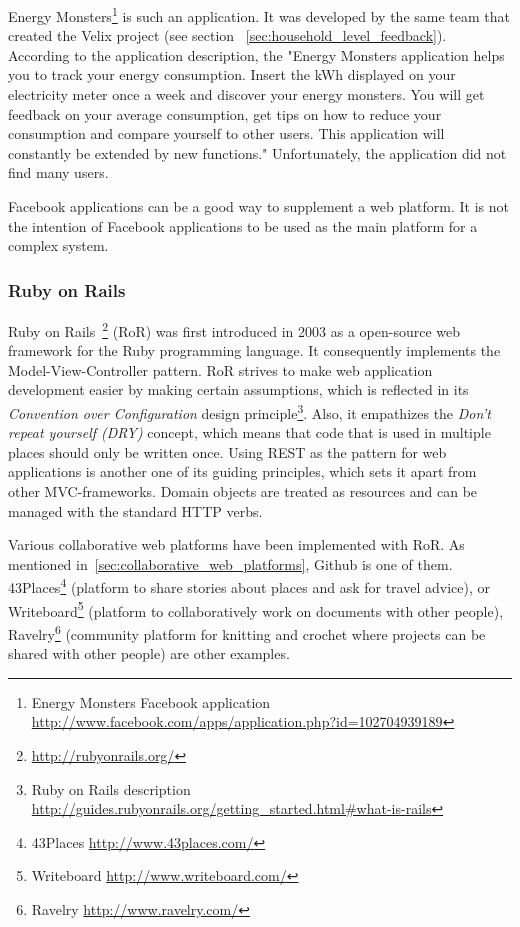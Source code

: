 Energy Monsters\footnote{Energy Monsters Facebook application \url{http://www.facebook.com/apps/application.php?id=102704939189}} is such an application. It was developed by the same team that created the Velix project (see section ~\ref{sec:household_level_feedback}). According to the application description, the "Energy Monsters application helps you to track your energy consumption. Insert the kWh displayed on your electricity meter once a week and discover your energy monsters. You will get feedback on your average consumption, get tips on how to reduce your consumption and compare yourself to other users. This application will constantly be extended by new functions." Unfortunately, the application did not find many users. 

Facebook applications can be a good way to supplement a web platform. It is not the intention of Facebook applications to be used as the main platform for a complex system.

\subsubsection{Ruby on Rails}
Ruby on Rails~\footnote{\url{http://rubyonrails.org/}} (RoR) was first introduced in 2003 as a open-source web framework for the Ruby programming language. It consequently implements the Model-View-Controller pattern. 
RoR strives to make web application development easier by making certain assumptions, which is reflected in its \textit{Convention over Configuration} design principle\footnote{Ruby on Rails description \url{http://guides.rubyonrails.org/getting_started.html#what-is-rails}}. Also, it empathizes the \textit{Don't repeat yourself (DRY)} concept, which means that code that is used in multiple places should only be written once. 
Using REST as the pattern for web applications is another one of its guiding principles, which sets it apart from other MVC-frameworks. Domain objects are treated as resources and can be managed with the standard HTTP verbs.

Various collaborative web platforms have been implemented with RoR. As mentioned in~\ref{sec:collaborative_web_platforms}, Github is one of them. 43Places\footnote{43Places \url{http://www.43places.com/}} (platform to share stories about places and ask for travel advice), or Writeboard\footnote{Writeboard \url{http://www.writeboard.com/}} (platform to collaboratively work on documents with other people), Ravelry\footnote{Ravelry \url{http://www.ravelry.com/}} (community platform for knitting and crochet where projects can be shared with other people) are other examples.

